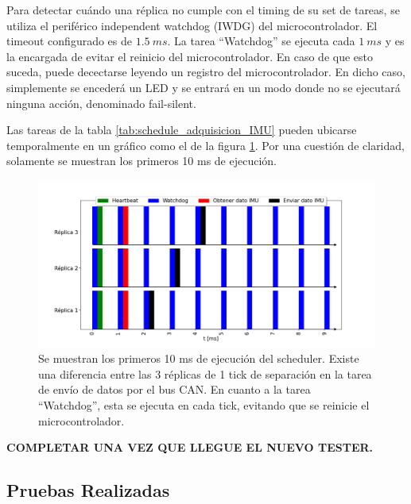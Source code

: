 Para detectar cuándo una réplica no cumple con el timing de su set de tareas, se utiliza el periférico independent watchdog (IWDG) del microcontrolador. El timeout configurado es de $1.5 \ ms$. La tarea ``Watchdog'' se ejecuta cada $1 \ ms$ y es la encargada de evitar el reinicio del microcontrolador. En caso de que esto suceda, puede decectarse leyendo un registro del microcontrolador. En dicho caso, simplemente se encederá un LED y se entrará en un modo donde no se ejecutará ninguna acción, denominado fail-silent.

Las tareas de la tabla \ref{tab:schedule_adquisicion_IMU} pueden ubicarse temporalmente en un gráfico como el de la figura \ref{fig:grafico_hyperperiod_adquisicion_IMU}. Por una cuestión de claridad, solamente se muestran los primeros 10 ms de ejecución. 
 
\begin{figure}[H]
    \centering
    \includegraphics[width=\textwidth]{img/grafico_hyperperiod_adquisicion_IMU.png}
    \caption{Se muestran los primeros 10 ms de ejecución del scheduler. Existe una diferencia entre las 3 réplicas de 1 tick de separación en la tarea de envío de datos por el bus CAN. En cuanto a la tarea ``Watchdog'', esta se ejecuta en cada tick, evitando que se reinicie el microcontrolador.}
    \label{fig:grafico_hyperperiod_adquisicion_IMU}
\end{figure}

{\Large \textbf{{\color{red} COMPLETAR UNA VEZ QUE LLEGUE EL NUEVO TESTER.}}}


\subsection{Pruebas Realizadas}

